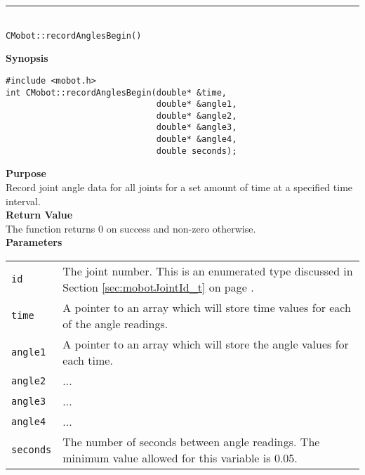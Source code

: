 \noindent
\vspace{5pt}
\rule{4.5in}{0.015in}\\
\noindent
{\LARGE \texttt{CMobot::recordAnglesBegin()}}\\
{}

\noindent
{\bf Synopsis}
\vspace{-8pt}
\begin{verbatim}
#include <mobot.h>
int CMobot::recordAnglesBegin(double* &time, 
                              double* &angle1, 
                              double* &angle2, 
                              double* &angle3, 
                              double* &angle4, 
                              double seconds);
\end{verbatim}

\noindent
{\bf Purpose}\\
Record joint angle data for all joints for a set amount of time at a specified time interval.\\

\noindent
{\bf Return Value}\\
The function returns 0 on success and non-zero otherwise.\\

\noindent
{\bf Parameters}\\
\vspace{-0.1in}
\begin{description}
\item               
\begin{tabular}{p{15 mm}p{145 mm}}
\texttt{id} & The joint number. This is an enumerated type 
discussed in Section \ref{sec:mobotJointId_t} on page
\pageref{sec:mobotJointId_t}.\\
\texttt{time} & A pointer to an array which will store time values for each of the angle readings. \\
\texttt{angle1} & A pointer to an array which will store the angle values for each time. \\
\texttt{angle2} & ... \\
\texttt{angle3} & ... \\
\texttt{angle4} & ... \\
\texttt{seconds} & The number of seconds between angle readings. The minimum value allowed for
this variable is 0.05.
\end{tabular}
\end{description}

